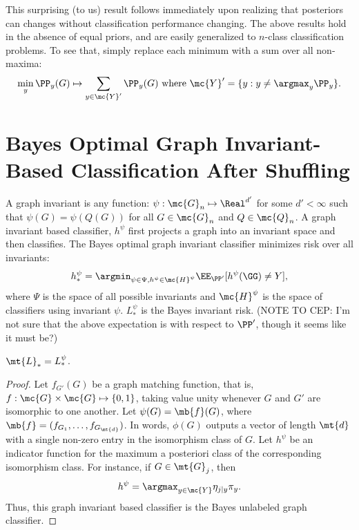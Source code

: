 \documentclass[10pt,journal,cspaper,compsoc]{IEEEtran}
\newcommand{\Qs}{Q}
\begin{document}
This surprising (to us) result follows immediately upon realizing that posteriors can changes without classification performance changing.  The above results hold in the absence of equal priors, and are easily generalized to  $n$-class classification problems.  To see that, simply replace each minimum with a sum over all non-maxima: $$\min_y \PP_y(G) \mapsto \sum_{y \in \mc{Y}'} \PP_y(G) \text{ where } \mc{Y}' =\{y : y \neq \argmax_y \PP_y\}.$$



\section{Bayes Optimal Graph Invariant-Based Classification After Shuffling} %
\label{sec:gi}

A graph invariant is any function: $\psi: \mc{G}_n \mapsto \Real^{d'}$  for some $d' < \infty$ such that $\psi(G)=\psi(\Qs(G))$ for all $G \in \mc{G}_n$ and $\Qs \in \mc{Q}_n$.  A graph invariant based classifier, $h^{\psi}$ first projects a graph into an invariant space and then classifies.  The Bayes optimal graph invariant classifier minimizes risk over all invariants: 
\begin{align}
	h_*^{\psi}=\argmin_{\psi \in \Psi, h^{\psi} \in \mc{H}^{\psi}} \EE_{\PP'}[h^{\psi}(\GG)\neq Y],
\end{align}
where $\Psi$ is the space of all possible invariants and $\mc{H}^{\psi}$ is the space of classifiers using invariant $\psi$.   $L_*^{\psi}$ is the Bayes invariant risk.  (NOTE TO CEP: I'm not sure that the above expectation is with respect to $\PP'$, though it seems like it must be?)

\begin{thm}
	$\mt{L}_*=L_*^\psi$.
\end{thm}

\begin{proof}
 Let $f_{G'}(G)$ be a graph matching function, that is, $f: \mc{G} \times \mc{G} \mapsto \{0,1\}$, taking value unity whenever $G$ and $G'$ are isomorphic to one another.  Let $\psi(G)=\mb{f}(G)$, where $\mb{f}=(f_{G_1}, \ldots, f_{G_{\mt{d}}})$.  In words, $\phi(G)$ outputs a vector of length $\mt{d}$ with a single non-zero entry in the isomorphism class of $G$.  Let $h^{\psi}$ be an indicator function for the maximum a posteriori class of the corresponding isomorphism class. For instance, if $G \in \mt{G}_j$, then
\begin{align}
	h^{\psi}= \argmax_{y \in \mc{Y}} \eta_{j|y} \pi_y.
\end{align}
Thus, this graph invariant based classifier is the Bayes unlabeled graph classifier.
\end{proof}
\end{document}
